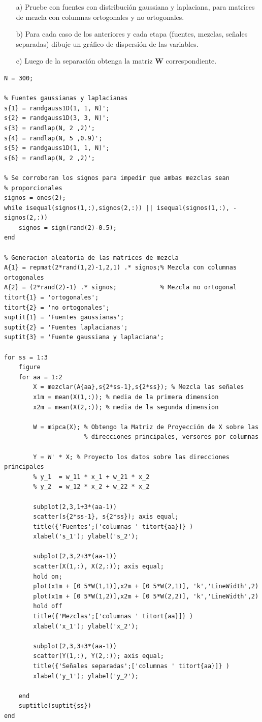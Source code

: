 \documentclass[11pt,a4paper,final]{article}
\begin{document}
\begin{enumerate}
   \item[a)] Pruebe con fuentes con distribución gaussiana y laplaciana, para matrices de mezcla con columnas ortogonales y no ortogonales.
   \item[b)] Para cada caso de los anteriores y cada etapa (fuentes, mezclas, señales separadas) dibuje un gráfico de dispersión de las variables.
   \item[c)] Luego de la separación obtenga la matriz $\mathbf{W}$ correspondiente.
\end{enumerate}
\begin{verbatim}
N = 300;

% Fuentes gaussianas y laplacianas
s{1} = randgauss1D(1, 1, N)';
s{2} = randgauss1D(3, 3, N)';
s{3} = randlap(N, 2 ,2)';
s{4} = randlap(N, 5 ,0.9)';
s{5} = randgauss1D(1, 1, N)';
s{6} = randlap(N, 2 ,2)';

% Se corroboran los signos para impedir que ambas mezclas sean
% proporcionales
signos = ones(2);
while isequal(signos(1,:),signos(2,:)) || isequal(signos(1,:), -signos(2,:))
    signos = sign(rand(2)-0.5);
end

% Generacion aleatoria de las matrices de mezcla
A{1} = repmat(2*rand(1,2)-1,2,1) .* signos;% Mezcla con columnas ortogonales
A{2} = (2*rand(2)-1) .* signos;            % Mezcla no ortogonal
titort{1} = 'ortogonales';
titort{2} = 'no ortogonales';
suptit{1} = 'Fuentes gaussianas';
suptit{2} = 'Fuentes laplacianas';
suptit{3} = 'Fuente gaussiana y laplaciana';

for ss = 1:3
    figure
    for aa = 1:2
        X = mezclar(A{aa},s{2*ss-1},s{2*ss}); % Mezcla las señales
        x1m = mean(X(1,:)); % media de la primera dimension
        x2m = mean(X(2,:)); % media de la segunda dimension

        W = mipca(X); % Obtengo la Matriz de Proyección de X sobre las
                      % direcciones principales, versores por columnas

        Y = W' * X; % Proyecto los datos sobre las direcciones principales
        % y_1  = w_11 * x_1 + w_21 * x_2
        % y_2  = w_12 * x_2 + w_22 * x_2

        subplot(2,3,1+3*(aa-1))
        scatter(s{2*ss-1}, s{2*ss}); axis equal;
        title({'Fuentes';['columnas ' titort{aa}]} )
        xlabel('s_1'); ylabel('s_2');

        subplot(2,3,2+3*(aa-1))
        scatter(X(1,:), X(2,:)); axis equal;
        hold on;
        plot(x1m + [0 5*W(1,1)],x2m + [0 5*W(2,1)], 'k','LineWidth',2)
        plot(x1m + [0 5*W(1,2)],x2m + [0 5*W(2,2)], 'k','LineWidth',2)
        hold off
        title({'Mezclas';['columnas ' titort{aa}]} )
        xlabel('x_1'); ylabel('x_2');

        subplot(2,3,3+3*(aa-1))
        scatter(Y(1,:), Y(2,:)); axis equal;
        title({'Señales separadas';['columnas ' titort{aa}]} )
        xlabel('y_1'); ylabel('y_2');

    end
    suptitle(suptit{ss})
end
\end{verbatim}
\end{document}
